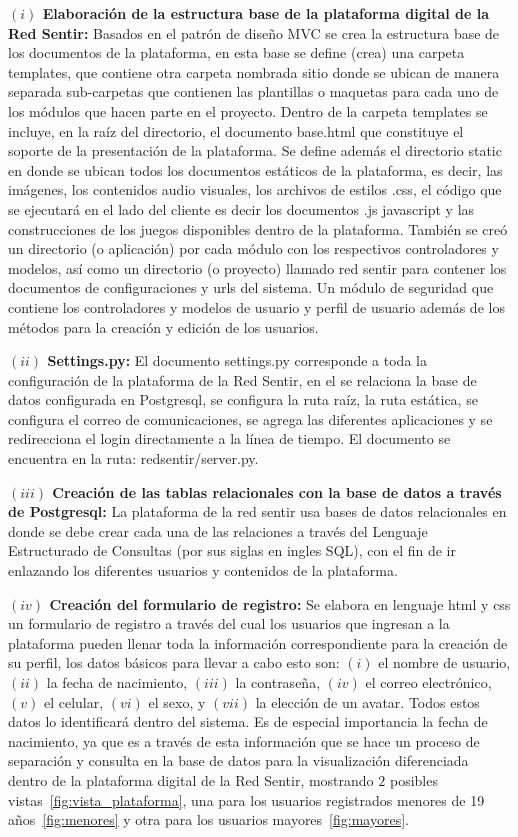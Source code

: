 \documentclass[journal,transmag]{IEEEtran}
\begin{document}
\textbf{$(i)$ Elaboración de la estructura base de la plataforma digital de la Red Sentir:}  Basados en el patrón de diseño MVC se crea la estructura base de los documentos de la plataforma, en esta base se define (crea) una carpeta templates, que contiene otra carpeta nombrada sitio donde se ubican de manera separada sub-carpetas que contienen las plantillas o maquetas para cada uno de los módulos que hacen parte en el proyecto. Dentro de la carpeta templates se incluye, en la raíz del directorio, el documento base.html que constituye el soporte de la presentación de la plataforma. Se define además el directorio static en donde se ubican todos los documentos estáticos de la plataforma, es decir, las imágenes, los contenidos audio visuales, los archivos de estilos .css, el código que se ejecutará en el lado del cliente es decir los documentos .js javascript y las construcciones de los juegos disponibles dentro de la plataforma. También se creó un directorio (o aplicación) por cada módulo con los respectivos controladores y modelos, así como un directorio (o proyecto) llamado red sentir para contener los documentos de configuraciones y urls del sistema. Un módulo de seguridad que contiene los controladores y modelos de usuario y perfil de usuario además de los métodos para la creación y edición de los usuarios.

\textbf{$(ii)$ Settings.py:} El documento settings.py corresponde a toda la configuración de la plataforma de la Red Sentir, en el se relaciona la base de datos configurada en Postgresql, se configura la ruta raíz, la ruta estática, se configura el correo de comunicaciones, se agrega las diferentes aplicaciones y se redirecciona el login directamente a la línea de tiempo. El documento se encuentra en la ruta: redsentir/server.py.

\textbf{$(iii)$ Creación de las tablas relacionales con la base de datos a través de Postgresql:} La plataforma de la red sentir usa bases de datos relacionales en donde se debe crear cada una de las relaciones a través del Lenguaje Estructurado de Consultas (por sus siglas en ingles SQL), con el fin de ir enlazando los diferentes usuarios y contenidos de la plataforma.

\textbf{$(iv)$ Creación del formulario de registro:} Se elabora en lenguaje html y css un formulario de registro a través del cual los usuarios que ingresan a la plataforma pueden llenar toda la información correspondiente para la creación de su perfil, los datos básicos para llevar a cabo esto son: $(i)$ el nombre de usuario, $(ii)$ la fecha de nacimiento, $(iii)$ la contraseña, $(iv)$ el correo electrónico, $(v)$ el celular, $(vi)$ el sexo, y $(vii)$ la elección de un avatar. Todos estos datos lo identificará dentro del sistema. Es de especial importancia la fecha de nacimiento, ya que es a través de esta información que se hace un proceso de separación y consulta en la base de datos para la visualización diferenciada dentro de la plataforma digital de la Red Sentir, mostrando $2$ posibles vistas~\ref{fig:vista_plataforma}, una para los usuarios registrados menores de 19 años~\ref{fig:menores} y otra para los usuarios mayores~\ref{fig:mayores}.
\end{document}
